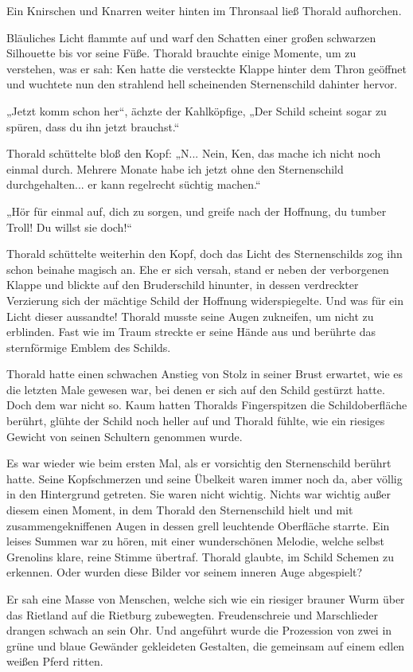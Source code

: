 Ein Knirschen und Knarren weiter hinten im Thronsaal ließ Thorald aufhorchen.

Bläuliches Licht flammte auf und warf den Schatten einer großen schwarzen Silhouette bis vor seine Füße. Thorald brauchte einige Momente, um zu verstehen, was er sah: Ken hatte die versteckte Klappe hinter dem Thron geöffnet und wuchtete nun den strahlend hell scheinenden Sternenschild dahinter hervor.

„Jetzt komm schon her“, ächzte der Kahlköpfige, „Der Schild scheint sogar zu spüren, dass du ihn jetzt brauchst.“

Thorald schüttelte bloß den Kopf: „N... Nein, Ken, das mache ich nicht noch einmal durch. Mehrere Monate habe ich jetzt ohne den Sternenschild durchgehalten... er kann regelrecht süchtig machen.“

„Hör für einmal auf, dich zu sorgen, und greife nach der Hoffnung, du tumber Troll! Du willst sie doch!“

Thorald schüttelte weiterhin den Kopf, doch das Licht des Sternenschilds zog ihn schon beinahe magisch an. Ehe er sich versah, stand er neben der verborgenen Klappe und blickte auf den Bruderschild hinunter, in dessen verdreckter Verzierung sich der mächtige Schild der Hoffnung widerspiegelte. Und was für ein Licht dieser aussandte! Thorald musste seine Augen zukneifen, um nicht zu erblinden. Fast wie im Traum streckte er seine Hände aus und berührte das sternförmige Emblem des Schilds.

Thorald hatte einen schwachen Anstieg von Stolz in seiner Brust erwartet, wie es die letzten Male gewesen war, bei denen er sich auf den Schild gestürzt hatte. Doch dem war nicht so. Kaum hatten Thoralds Fingerspitzen die Schildoberfläche berührt, glühte der Schild noch heller auf und Thorald fühlte, wie ein riesiges Gewicht von seinen Schultern genommen wurde.

Es war wieder wie beim ersten Mal, als er vorsichtig den Sternenschild berührt hatte. Seine Kopfschmerzen und seine Übelkeit waren immer noch da, aber völlig in den Hintergrund getreten. Sie waren nicht wichtig. Nichts war wichtig außer diesem einen Moment, in dem Thorald den Sternenschild hielt und mit zusammengekniffenen Augen in dessen grell leuchtende Oberfläche starrte. Ein leises Summen war zu hören, mit einer wunderschönen Melodie, welche selbst Grenolins klare, reine Stimme übertraf. Thorald glaubte, im Schild Schemen zu erkennen. Oder wurden diese Bilder vor seinem inneren Auge abgespielt?

Er sah eine Masse von Menschen, welche sich wie ein riesiger brauner Wurm über das Rietland auf die Rietburg zubewegten. Freudenschreie und Marschlieder drangen schwach an sein Ohr. Und angeführt wurde die Prozession von zwei in grüne und blaue Gewänder gekleideten Gestalten, die gemeinsam auf einem edlen weißen Pferd ritten.

